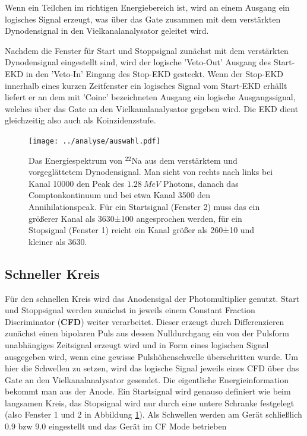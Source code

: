 \documentclass[a4paper,12pt]{article}
\begin{document}
Wenn ein Teilchen im richtigen Energiebereich ist, wird an einem Ausgang ein logisches Signal erzeugt,
was über das Gate zusammen mit dem verstärkten Dynodensignal in den Vielkanalanalysator geleitet wird.

Nachdem die Fenster für Start und Stoppsignal zunächst mit dem verstärkten Dynodensignal eingestellt sind,
wird der logische 'Veto-Out' Ausgang des Start-EKD in den 'Veto-In' Eingang des Stop-EKD gesteckt. Wenn der
Stop-EKD innerhalb eines kurzen Zeitfenster ein logisches Signal vom Start-EKD erhällt liefert er an dem mit
'Coinc' bezeichneten Ausgang ein logische Ausgangssignal, welches über das Gate an den Vielkanalanalysator gegeben wird.
Die EKD dient gleichzeitig also auch als Koinzidenzstufe.


\begin{figure}[h]
	\centering
	\texttt{[image: ../analyse/auswahl.pdf]}
	\caption{Das Energiespektrum von $^{22}$Na aus dem verstärktem und vorgeglättetem
		Dynodensignal.
		Man sieht von rechts nach links bei Kanal 10000 den Peak des $\SI{1.28}{MeV}$ Photons,
		danach das Comptonkontinuum und bei etwa Kanal 3500 den Annihilationspeak.
		Für ein Startsignal (Fenster 2) muss das ein größerer Kanal als 3630±100 angesprochen werden,
		für ein Stopsignal (Fenster 1) reicht ein Kanal größer als 260±10 und kleiner als 3630.}
	\label{fig:auswahl}
\end{figure}


\subsection*{Schneller Kreis}
Für den schnellen Kreis wird das Anodensigal der Photomultiplier genutzt.
Start und Stoppsignal werden zunächst in jeweils einem Constant
Fraction Discriminator (\textbf{CFD}) weiter verarbeitet.
Dieser erzeugt durch Differenzieren zunächst einen bipolaren Puls aus dessen Nulldurchgang ein von der Pulsform unabhängiges Zeitsignal erzeugt wird
und in Form eines logischen Signal ausgegeben wird, wenn eine gewisse Pulshöhenschwelle überschritten wurde.
Um hier die Schwellen zu setzen, wird das logische Signal jeweils eines CFD über das Gate an den Vielkanalanalysator gesendet.
Die eigentliche Energieinformation bekommt man aus der Anode.
Ein Startsignal wird genauso definiert wie beim langsamen Kreis, das Stopsignal wird nur durch eine untere Schranke festgelegt (also Fenster 1 und 2 in Abbildung \ref{fig:auswahl}).
Als Schwellen werden am Gerät schließlich 0.9 bzw 9.0 eingestellt und das Gerät im CF Mode betrieben
\end{document}
